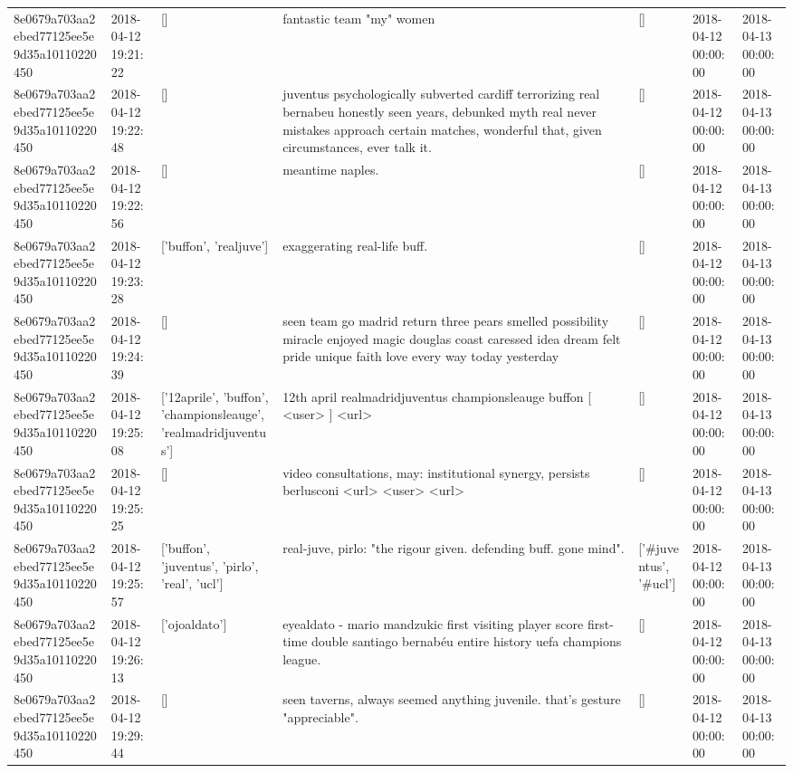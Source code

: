 \begin{tabular}{lllllll}
8e0679a703aa2ebed77125ee5e9d35a10110220450 & 2018-04-12 19:21:22 & [] & fantastic team "my" women 👏👏👏 & [] & 2018-04-12 00:00:00 & 2018-04-13 00:00:00 \\
8e0679a703aa2ebed77125ee5e9d35a10110220450 & 2018-04-12 19:22:48 & [] & juventus psychologically subverted cardiff terrorizing real bernabeu honestly seen years, debunked myth real never mistakes approach certain matches, wonderful that, given circumstances, ever talk it. & [] & 2018-04-12 00:00:00 & 2018-04-13 00:00:00 \\
8e0679a703aa2ebed77125ee5e9d35a10110220450 & 2018-04-12 19:22:56 & [] & meantime naples. & [] & 2018-04-12 00:00:00 & 2018-04-13 00:00:00 \\
8e0679a703aa2ebed77125ee5e9d35a10110220450 & 2018-04-12 19:23:28 & ['buffon', 'realjuve'] & exaggerating real-life buff. & [] & 2018-04-12 00:00:00 & 2018-04-13 00:00:00 \\
8e0679a703aa2ebed77125ee5e9d35a10110220450 & 2018-04-12 19:24:39 & [] & seen team go madrid return three pears smelled possibility miracle enjoyed magic douglas coast caressed idea dream felt pride unique faith love every way today yesterday & [] & 2018-04-12 00:00:00 & 2018-04-13 00:00:00 \\
8e0679a703aa2ebed77125ee5e9d35a10110220450 & 2018-04-12 19:25:08 & ['12aprile', 'buffon', 'championsleauge', 'realmadridjuventus'] & 12th april realmadridjuventus championsleauge buffon [ <user> ] <url> & [] & 2018-04-12 00:00:00 & 2018-04-13 00:00:00 \\
8e0679a703aa2ebed77125ee5e9d35a10110220450 & 2018-04-12 19:25:25 & [] & video consultations, may: institutional synergy, persists berlusconi <url> <user> <url> & [] & 2018-04-12 00:00:00 & 2018-04-13 00:00:00 \\
8e0679a703aa2ebed77125ee5e9d35a10110220450 & 2018-04-12 19:25:57 & ['buffon', 'juventus', 'pirlo', 'real', 'ucl'] & real-juve, pirlo: "the rigour given. defending buff. gone mind". & ['#juventus', '#ucl'] & 2018-04-12 00:00:00 & 2018-04-13 00:00:00 \\
8e0679a703aa2ebed77125ee5e9d35a10110220450 & 2018-04-12 19:26:13 & ['ojoaldato'] & eyealdato - mario mandzukic first visiting player score first-time double santiago bernabéu entire history uefa champions league. & [] & 2018-04-12 00:00:00 & 2018-04-13 00:00:00 \\
8e0679a703aa2ebed77125ee5e9d35a10110220450 & 2018-04-12 19:29:44 & [] & seen taverns, always seemed anything juvenile. that's gesture "appreciable". & [] & 2018-04-12 00:00:00 & 2018-04-13 00:00:00 \\

\end{tabular}
